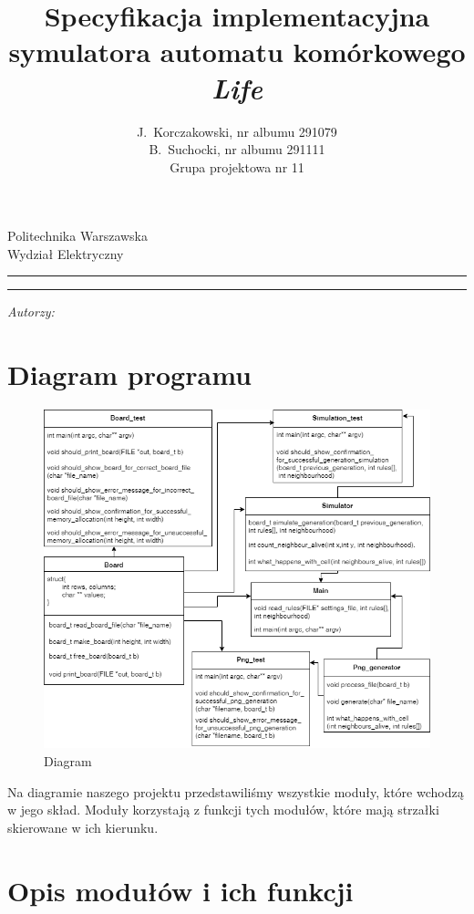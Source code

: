 \documentclass[a4paper,11pt, notitlepage ]{article}
\author{J.~Korczakowski, nr albumu 291079\\ B.~Suchocki, nr albumu 291111\\ Grupa projektowa nr 11}
\title{Specyfikacja implementacyjna symulatora automatu komórkowego \textsl{Life}}
\makeatletter
\newcommand{\linia}{\rule{\linewidth}{0.4mm}}
\renewcommand{\maketitle}{\begin{titlepage}
    \vspace*{1cm}
    \begin{center}\small
    Politechnika Warszawska\\
    Wydział Elektryczny
    \end{center}
    \vspace{3cm}
    \noindent\linia
    \begin{center}
      \LARGE \textsc{\@title}
         \end{center}
     \linia
    \vspace{0.5cm}
    \begin{flushright}
    \begin{minipage}{8cm}
    \textit{\small Autorzy:}\\
    \normalsize \textsc{\@author} \par
    \end{minipage}
    \end{flushright}
    \vspace*{\stretch{6}}
    \begin{center}
    \@date
    \end{center}
  \end{titlepage}%
}
\makeatother
\begin{document}
\maketitle
\setcounter{page}{2}
\tableofcontents
\newpage
\section{Diagram programu}
\begin{figure}[h]
\centering
\includegraphics[width=13cm]{Modules_diagram}
\caption{Diagram}
\end{figure}

Na diagramie naszego projektu przedstawiliśmy wszystkie moduły, które wchodzą w jego skład. Moduły korzystają z funkcji tych modułów, które mają strzałki skierowane w ich kierunku.

\section{Opis modułów i ich funkcji}
\end{document}
